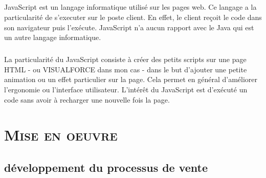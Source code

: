 \documentclass[a4paper, 12pt]{report}
\begin{document}
\begin{itemize}
\paragraph{}
JavaScript est un langage informatique utilisé sur les pages web. Ce langage a la particularité de s'executer sur le poste client. En effet, le client reçoit le code dans son navigateur puis l'exécute.
JavaScript n'a aucun rapport avec le Java qui est un autre langage informatique.
\paragraph{}
La particularité du JavaScript consiste à créer des petits scripts sur une page HTML - ou VISUALFORCE dans mon cas - dans le but d'ajouter une petite animation ou un effet particulier sur la page. Cela permet en général d'améliorer l'ergonomie ou l'interface utilisateur. L'intérêt du JavaScript est d'exécuté un code sans avoir à recharger une nouvelle fois la page.



\chapter{\textsc{Mise en oeuvre}}
\section{développement du processus de vente}

\end{itemize}
\end{document}
